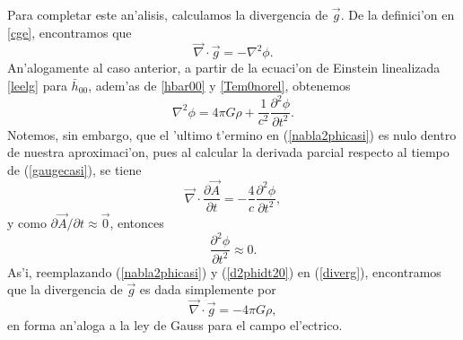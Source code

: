 Para completar este an'alisis, calculamos la divergencia de $\vec{g}$. De la definici'on en \eqref{cge}, encontramos que
\begin{equation}
\vec{\nabla}\cdot\vec{g}=-{\nabla}^2\phi.\label{diverg}
\end{equation}
An'alogamente al caso anterior, a partir de la ecuaci'on de Einstein linealizada \eqref{leelg} para $\bar{h}_{00}$, adem'as de \eqref{hbar00} y \eqref{Tem0norel}, obtenemos
\begin{equation}
{\nabla}^2\phi=4\pi G\rho +\frac{1}{c^2}\frac{\partial^2 \phi}{\partial t^2}.\label{nabla2phicasi}
\end{equation}
Notemos, sin embargo, que el 'ultimo t'ermino en (\ref{nabla2phicasi}) es nulo dentro de nuestra aproximaci'on, pues al calcular la derivada parcial respecto al tiempo de (\ref{gaugecasi}), se tiene
\begin{equation}
\vec{\nabla}\cdot\frac{\partial \vec{A}}{\partial t}=-\frac{4}{c}\frac{\partial^2\phi}{\partial t^2},
\end{equation}
y como $\partial \vec{A}/\partial t\approx\vec{0}$, entonces
\begin{equation}
\frac{\partial^2\phi}{\partial t^2}\approx 0.\label{d2phidt20}
\end{equation}
As'i, reemplazando (\ref{nabla2phicasi}) y (\ref{d2phidt20}) en (\ref{diverg}), encontramos que la divergencia de $\vec{g}$ es dada simplemente por
\begin{equation}
\vec{\nabla}\cdot\vec{g}=-4\pi G\rho ,
\end{equation}
en forma an'aloga a la ley de Gauss para el campo el'ectrico.

